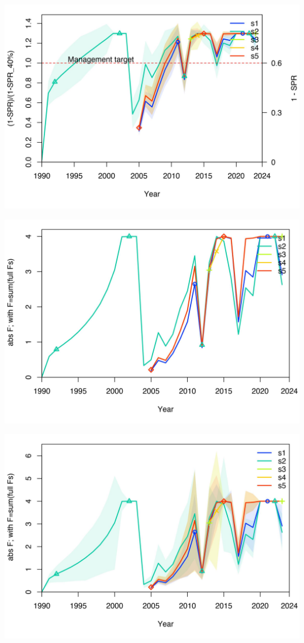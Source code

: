 \documentclass[
]{article}
\begin{document}
\begin{center}\includegraphics{Dtrunculus_SS3_2024_files/figure-latex/unnamed-chunk-17-5} \end{center}

\begin{center}\includegraphics{Dtrunculus_SS3_2024_files/figure-latex/unnamed-chunk-17-6} \end{center}

\begin{center}\includegraphics{Dtrunculus_SS3_2024_files/figure-latex/unnamed-chunk-17-7} \end{center}
\end{document}
